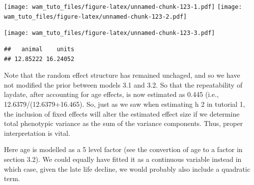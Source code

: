 \documentclass[
  12pt,
]{book}
\newenvironment{Shaded}{\begin{snugshade}}{\end{snugshade}}
\newcommand{\AttributeTok}[1]{\textcolor[rgb]{0.77,0.63,0.00}{#1}}
\newcommand{\ConstantTok}[1]{\textcolor[rgb]{0.00,0.00,0.00}{#1}}
\newcommand{\FloatTok}[1]{\textcolor[rgb]{0.00,0.00,0.81}{#1}}
\newcommand{\FunctionTok}[1]{\textcolor[rgb]{0.00,0.00,0.00}{#1}}
\newcommand{\NormalTok}[1]{#1}
\newcommand{\OtherTok}[1]{\textcolor[rgb]{0.56,0.35,0.01}{#1}}
\newcommand{\SpecialCharTok}[1]{\textcolor[rgb]{0.00,0.00,0.00}{#1}}
\begin{document}
\begin{Shaded}
\end{Shaded}

\texttt{[image: wam\_tuto\_files/figure-latex/unnamed-chunk-123-1.pdf]} \texttt{[image: wam\_tuto\_files/figure-latex/unnamed-chunk-123-2.pdf]}

\begin{Shaded}
\end{Shaded}

\texttt{[image: wam\_tuto\_files/figure-latex/unnamed-chunk-123-3.pdf]}

\begin{Shaded}
\end{Shaded}

\begin{verbatim}
##   animal    units 
## 12.85222 16.24052
\end{verbatim}

Note that the random effect structure has remained unchaged, and so we have not modified the prior between models 3.1 and 3.2. So that the repeatability of laydate, after accounting for age effects, is now estimated as 0.445 (i.e., 12.6379/(12.6379+16.465). So, just as we saw when estimating h 2 in tutorial 1, the inclusion of fixed effects will alter the estimated effect size if we determine total phenotypic variance as the sum of the variance components. Thus, proper interpretation is vital.

Here age is modelled as a 5 level factor (see the convertion of age to a factor in section 3.2). We could equally have fitted it as a continuous variable instead in which case, given the late life decline, we would probably also include a quadratic term.
\end{document}
